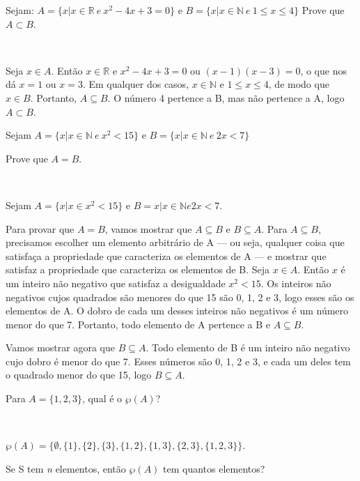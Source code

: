 \documentclass[a4paper, 12pt, addpoints]{exam}
\begin{document}
\begin{questions}
\question  Sejam: $A = \{x | x \in \mathbb{R} ~ e ~ x^2 - 4x + 3 = 0\}$
 e $B = \{x | x \in \mathbb{N} ~ e ~ 1 \leq x \leq 4\}$
\vspace{4mm}
Prove que $A \subset B.$

\begin{resp}~
    
    Seja $x \in A$. Então $x \in \mathbb{R}$ e $x^2 - 4x + 3 = 0$ ou $(x - 1)(x - 3) = 0$, o que nos dá $x = 1$ ou $x = 3$. Em qualquer dos casos, $x \in \mathbb{N}$ e $1 \leq x \leq 4$, de modo que $x \in B$. Portanto, $A \subseteq B$. O número 4 pertence a B, mas não pertence a A, logo $A \subset B$.
\end{resp}


\question Sejam $ A = \{x|x \in \mathbb{N} ~ e ~ x^2 < 15\} $
e $ B = \{x|x \in \mathbb{N} ~ e ~ 2x < 7 \} $

Prove que $A = B.$

\begin{resp}~
    
    Sejam $A = \{x | x \in x^2 < 15\}$ e $B = {x | x \in \mathbb{N} e 2x < 7}$.
    
    Para provar que $A = B$, vamos mostrar que $A \subseteq B$ e $B \subseteq A$. Para $A \subseteq B$, precisamos escolher um elemento arbitrário de A — ou seja, qualquer coisa que satisfaça a propriedade que caracteriza os elementos de A — e mostrar que satisfaz a propriedade que caracteriza os elementos de B. Seja $x \in A$. Então $x$ é um inteiro não negativo que satisfaz a desigualdade $x^2 < 15$. Os inteiros não negativos cujos quadrados são menores do que 15 são 0, 1, 2 e 3, logo esses são os elementos de A. O dobro de cada um desses inteiros não negativos é um número menor do que 7. Portanto, todo elemento de A pertence a B e $A \subseteq B$.

    Vamos mostrar agora que $B \subseteq A$. Todo elemento de B é um inteiro não negativo cujo dobro é menor do que 7. Esses números são 0, 1, 2 e 3, e cada um deles tem o quadrado menor do que 15, logo $B \subseteq A$.
\end{resp}

\question Para $A=\{1,2,3\}$, qual é o $\wp(A)$?

\begin{resp}~
    
    $\wp(A) = \{\emptyset, \{1\}, \{2\}, \{3\}, \{1, 2\}, \{1, 3\}, \{2, 3\}, \{1, 2, 3\}\}$.
\end{resp}

\question Se S tem \textit{n} elementos, então $\wp(A)$ tem quantos elementos?



\end{questions}
\end{document}

